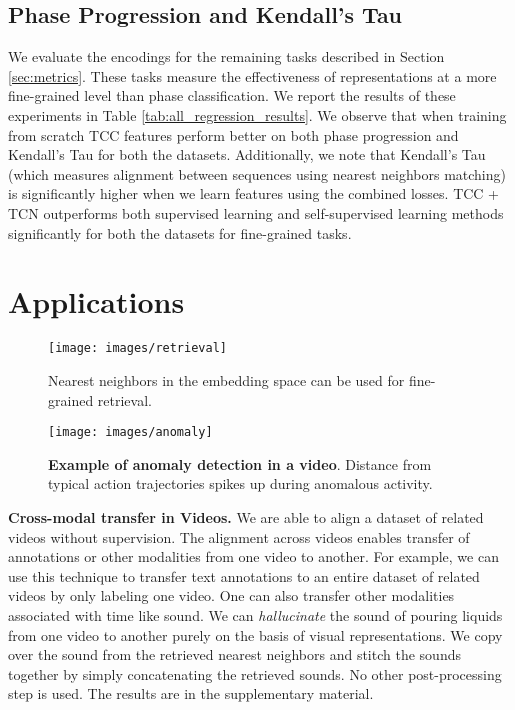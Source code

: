 \documentclass[10pt,twocolumn,letterpaper]{article}
\begin{document}
\subsection{Phase Progression and Kendall's Tau}
We evaluate the encodings for the remaining tasks described in Section \ref{sec:metrics}. These tasks measure the effectiveness of representations at a more fine-grained level than phase classification. We report the results of these experiments in Table \ref{tab:all_regression_results}. We observe that when training from scratch TCC features perform better on both phase progression and Kendall's Tau for both the datasets. Additionally, we note that Kendall's Tau (which measures alignment between sequences using nearest neighbors matching) is significantly higher when we learn features using the combined losses. TCC + TCN outperforms both supervised learning and self-supervised learning methods significantly for both the datasets for fine-grained tasks. \section{Applications}

\begin{figure}[!t]
\centering
\texttt{[image: images/retrieval]}
\caption{Nearest neighbors in the embedding space can be used for fine-grained retrieval.}
\label{fig:retrieval}
\end{figure}

\begin{figure}[!t]
\centering
\texttt{[image: images/anomaly]}
\caption{\textbf{Example of anomaly detection in a video}. Distance from typical action trajectories spikes up during anomalous activity.}
\label{fig:anomaly}
\vspace{-2em}
\end{figure}

    \noindent\textbf{Cross-modal transfer in Videos.} We are able to align a dataset of related videos without supervision. The alignment across videos enables transfer of annotations or other modalities from one video to another. For example, we can use this technique to transfer text annotations to an entire dataset of related videos by only labeling one video. One can also transfer other modalities associated with time like sound. We can \textit{hallucinate} the sound of pouring liquids from one video to another purely on the basis of visual representations. We copy over the sound from the retrieved nearest neighbors and stitch the sounds together by simply concatenating the retrieved sounds. No other post-processing step is used. The results are in the supplementary material.
\end{document}
